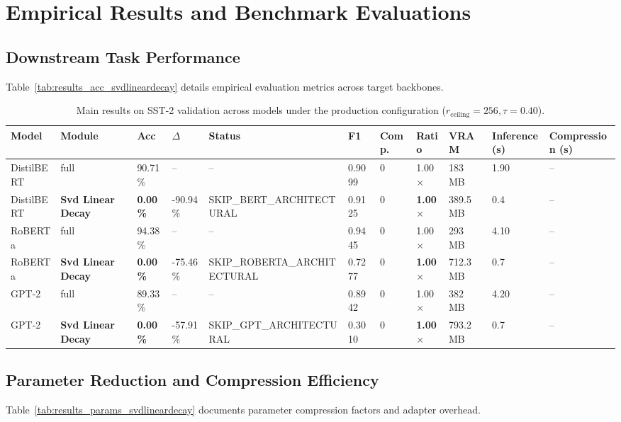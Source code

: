 \section{Empirical Results and Benchmark Evaluations}

\subsection{Downstream Task Performance}
Table~\ref{tab:results_acc_svdlineardecay} details empirical evaluation metrics across target backbones.

\begin{table}[t]
\centering
\small
\begin{tabular}{lllllllllll}
\toprule
\textbf{Model} & \textbf{Module} & \textbf{Acc} & \textbf{$\Delta$} & \textbf{Status} & \textbf{F1} & \textbf{Comp.} & \textbf{Ratio} & \textbf{VRAM} & \textbf{Inference (s)} & \textbf{Compression (s)} \\
\midrule
DistilBERT & full & 90.71\% & -- & -- & 0.9099 & 0 & 1.00$\times$ & 183 MB & 1.90 & -- \\
DistilBERT & \textbf{Svd Linear Decay} & \textbf{0.00\%} & -90.94\% & SKIP\_BERT\_ARCHITECTURAL & 0.9125 & 0 & \textbf{1.00$\times$} & 389.5 MB & 0.4 & -- \\
RoBERTa & full & 94.38\% & -- & -- & 0.9445 & 0 & 1.00$\times$ & 293 MB & 4.10 & -- \\
RoBERTa & \textbf{Svd Linear Decay} & \textbf{0.00\%} & -75.46\% & SKIP\_ROBERTA\_ARCHITECTURAL & 0.7277 & 0 & \textbf{1.00$\times$} & 712.3 MB & 0.7 & -- \\
GPT-2 & full & 89.33\% & -- & -- & 0.8942 & 0 & 1.00$\times$ & 382 MB & 4.20 & -- \\
GPT-2 & \textbf{Svd Linear Decay} & \textbf{0.00\%} & -57.91\% & SKIP\_GPT\_ARCHITECTURAL & 0.3010 & 0 & \textbf{1.00$\times$} & 793.2 MB & 0.7 & -- \\
\bottomrule
\end{tabular}
\caption{Main results on SST-2 validation across models under the production configuration ($r_{\mathrm{ceiling}}=256, \tau=0.40$).}
\label{tab:main_sst2}
\end{table}

\subsection{Parameter Reduction and Compression Efficiency}
Table~\ref{tab:results_params_svdlineardecay} documents parameter compression factors and adapter overhead.

